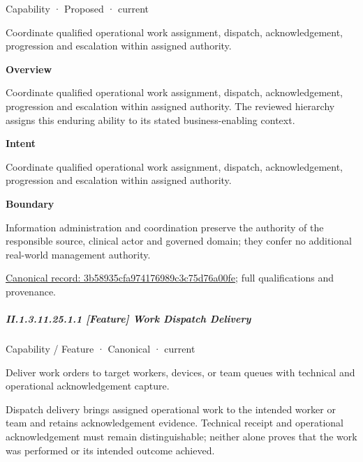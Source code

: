 \label{element:3b58935cfa974176989c3c75d76a00fe}
{\small Capability · Proposed · current}\par

Coordinate qualified operational work assignment, dispatch, acknowledgement, progression and escalation within assigned authority.



\textbf{Overview}



Coordinate qualified operational work assignment, dispatch, acknowledgement, progression and escalation within assigned authority. The reviewed hierarchy assigns this enduring ability to its stated business-enabling context.



\textbf{Intent}



Coordinate qualified operational work assignment, dispatch, acknowledgement, progression and escalation within assigned authority.



\textbf{Boundary}



Information administration and coordination preserve the authority of the responsible source, clinical actor and governed domain; they confer no additional real-world management authority.


{\footnotesize \href{../../../../continuum/strategy/capability/3b58935cfa974176989c3c75d76a00fe.md}{Canonical record: 3b58935cfa974176989c3c75d76a00fe}; full qualifications and provenance.}\par
\subparagraph*{II.1.3.11.25.1.1 [Feature] Work Dispatch Delivery}
\label{navigation:II.1.3.11.25.1.1}

\label{element:095826f788b64784af38af31bbe77105}
{\small Capability / Feature · Canonical · current}\par

Deliver work orders to target workers, devices, or team queues with technical and operational acknowledgement capture.



Dispatch delivery brings assigned operational work to the intended worker or team and retains acknowledgement evidence. Technical receipt and operational acknowledgement must remain distinguishable; neither alone proves that the work was performed or its intended outcome achieved.


